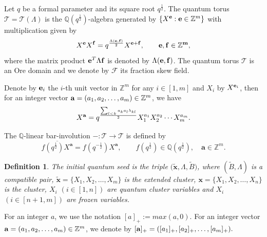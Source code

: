 \documentclass[reqno,11pt]{amsart}
\numberwithin{equation}{section}
\newtheorem{definition}[theorem]{Definition}
\def\e{{\bf{e}}}
\begin{document}
Let $q$ be a  formal parameter and its square root $q^{\frac{1}{2}}$.
The  quantum torus $\mathcal T=\mathcal T(\Lambda)$ is the
$\mathbb Q(q^{\frac{1}{2}})$-algebra generated by
$\{X^{\e}:\e\in\mathbb Z^m\}$ with multiplication given by
\begin{equation}\label{(ef)}
	X^{\e}X^{\bf f}=q^{\frac{\Lambda(\e,\bf f)}{2}}X^{\e+\bf f},
	\qquad \e,\bf f\in\mathbb Z^m,
\end{equation}
where the matrix product $\e^{T}\Lambda\bf f$  is denoted by $\Lambda(\e,\bf f)$. The quantum torus $\mathcal T$ is an Ore domain and we denote by $\mathcal{F}$ its
fraction skew field.


Denote by $\e_i$  the $i$-th unit vector in $\mathbb{Z}^m$ for any $ i\in [1,m]$ and $X_i$ by $X^{\e_i}$, then
for an integer vector ${\bf{a}}=(a_1, a_2, \dots, a_m)\in \mathbb{Z}^m$,  we have $$X^{\bf{a}}=q^{\frac{\sum_{l<k}a_ka_l\lambda_{kl}}{2}} X_1^{a_1}X_2^{a_2}\cdots X_m^{a_m}.$$

The $\mathbb{Q}$-linear bar-involution $-: \mathcal{T} \longrightarrow \mathcal{T}$  is defined by
\[
\overline{f(q^{\frac{1}{2}})X^{\mathbf a}}
=f(q^{-\frac{1}{2}})X^{\mathbf a},
\qquad
f(q^{\frac{1}{2}})\in \mathbb Q(q^{\frac{1}{2}}),\quad \mathbf {\mathbf a} \in\mathbb{Z}^m.
\]

\begin{definition}\label{def of generalized seed}
The initial quantum seed is the triple $\big(\widetilde{\mathbf{x}},\Lambda,\widetilde{B}\big)$, where $(\widetilde{B},\Lambda)$ is a compatible pair, $\widetilde{\mathbf{x}}=\{X_{1},X_2,\ldots, X_{m}\}$ is the extended cluster, $\mathbf{x}=\{X_{1},X_2,\ldots,X_{n}\}$ is the cluster,
 $X_i$ $(i\in [1,n])$ are  quantum cluster variables and  $X_{i}$ $(i\in [n+1, m])$ are  frozen variables.
\end{definition}

For an integer $a$, we use the notation $[a]_{+} := max(a, 0).$ For an integer vector ${\bf{a}}=(a_1, a_2, \dots, a_m)\in \mathbb{Z}^m$,  we denote by
${[\bf{a}]_{+}}=([a_1]_{+}, [a_2]_{+}, \dots, [a_m]_{+}).$
\end{document}
